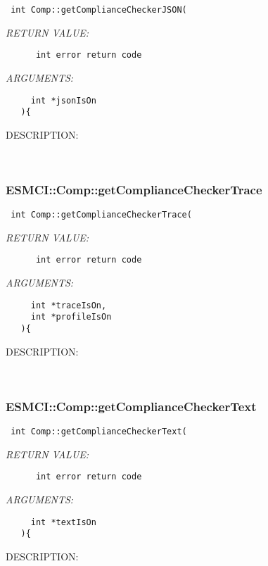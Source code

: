   
\begin{verbatim} int Comp::getComplianceCheckerJSON(\end{verbatim}{\em RETURN VALUE:}
\begin{verbatim}      int error return code\end{verbatim}{\em ARGUMENTS:}
\begin{verbatim}     int *jsonIsOn
   ){\end{verbatim}
{\sf DESCRIPTION:\\ }


   
 
\mbox{}\hrulefill\
 
\subsubsection [ESMCI::Comp::getComplianceCheckerTrace] {ESMCI::Comp::getComplianceCheckerTrace}


  
\begin{verbatim} int Comp::getComplianceCheckerTrace(\end{verbatim}{\em RETURN VALUE:}
\begin{verbatim}      int error return code\end{verbatim}{\em ARGUMENTS:}
\begin{verbatim}     int *traceIsOn,
     int *profileIsOn
   ){\end{verbatim}
{\sf DESCRIPTION:\\ }


   
 
\mbox{}\hrulefill\
 
\subsubsection [ESMCI::Comp::getComplianceCheckerText] {ESMCI::Comp::getComplianceCheckerText}


  
\begin{verbatim} int Comp::getComplianceCheckerText(\end{verbatim}{\em RETURN VALUE:}
\begin{verbatim}      int error return code\end{verbatim}{\em ARGUMENTS:}
\begin{verbatim}     int *textIsOn
   ){\end{verbatim}
{\sf DESCRIPTION:\\ }


